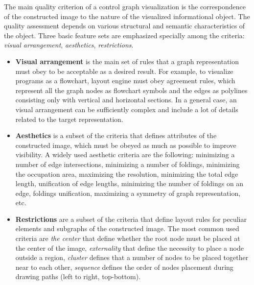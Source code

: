 \documentclass[conference]{IEEEtran}
\begin{document}
The main quality criterion of a control graph visualization is the correspondence of the constructed image to the nature of the visualized informational object.  The quality assessment depends on various structural and semantic characteristics of the object.  Three basic feature sets are emphasized specially among the criteria: \emph{visual arrangement}, \emph{aesthetics}, \emph{restrictions}.
\begin{itemize}
\item []\textbf{Visual arrangement} is the main set of rules that a graph representation must obey to be acceptable as a desired result.  For example, to visualize programs as a flowchart, layout engine must obey agreement rules, which represent all the graph nodes as flowchart symbols and the edges as polylines consisting only with vertical and horizontal sections.  In a general case, an visual arrangement can be sufficiently complex and include a lot of details related to the target representation.
\item []\textbf{Aesthetics} is a subset of the criteria that defines attributes of the constructed image, which must be obeyed as much as possible to improve visibility.  A widely used aesthetic criteria are the following: minimizing a number of edge intersections, minimizing a number of foldings, minimizing the occupation area, maximizing the resolution, minimizing the total edge length, unification of edge lengths, minimizing the number of foldings on an edge, foldings unification, maximizing a symmetry of graph representation, etc. %
\item []\textbf{Restrictions} are a subset of the criteria that define layout rules for peculiar elements and subgraphs of the constructed image.  The most common used criteria are \emph{the center} that define whether the root node must be placed at the center of the image, \emph{externality} that define the necessity to place a node outside a region, \emph{cluster} defines that a number of nodes to be placed together near to each other, \emph{sequence} defines the order of nodes placement during drawing paths (left to right, top-bottom).
\end{itemize}
\end{document}
